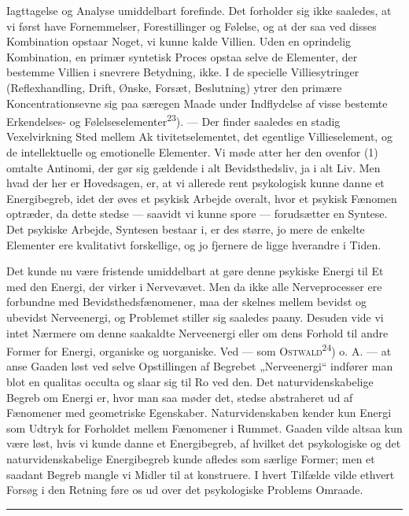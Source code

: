 \documentclass[12pt,a4paper,openany]{book}
\newcommand{\opage}[1]{\marginnote{\footnotesize\textit{[#1]}}}
\begin{document}
Iagttagelse og Analyse umiddelbart forefinde. Det forholder sig ikke saaledes,
at vi først have Fornemmelser, Forestillinger og Følelse, og at der saa ved
disses Kombination opstaar Noget, vi kunne kalde Villien. Uden en oprindelig
Kombination, en primær syntetisk Proces opstaa selve de Elementer, der bestemme
Villien i snevrere Betydning, ikke. I de specielle Villiesytringer
(Reflexhandling, Drift, Ønske, Forsæt, Beslutning) ytrer den primære
Koncentrationsevne sig paa særegen Maade under Indflydelse af visse bestemte
Erkendelses- og Følelseselementer\textsuperscript{23}). --- Der finder saaledes
en stadig Vexelvirkning Sted mellem Ak%
\opage{27}tivitetselementet, det egentlige Villieselement, og de intellektuelle
og emotionelle Elementer. Vi møde atter her den ovenfor (1) omtalte Antinomi,
der gør sig gældende i alt Bevidsthedsliv, ja i alt Liv. Men hvad der her er
Hovedsagen, er, at vi allerede rent psykologisk kunne danne et Energibegreb,
idet der øves et psykisk Arbejde overalt, hvor et psykisk Fænomen optræder, da
dette stedse --- saavidt vi kunne spore --- forudsætter en Syntese. Det
psykiske Arbejde, Syntesen bestaar i, er des større, jo mere de enkelte
Elementer ere kvalitativt forskellige, og jo fjernere de ligge hverandre i Tiden.

Det kunde nu være fristende umiddelbart at gøre denne psykiske Energi til Et
med den Energi, der virker i Nervevævet. Men da ikke alle Nerveprocesser ere
forbundne med Bevidsthedsfænomener, maa der skelnes mellem bevidst og ubevidst
Nerveenergi, og Problemet stiller sig saaledes paany. Desuden vide vi intet
Nærmere om denne saakaldte Nerveenergi eller om dens Forhold til andre Former
for Energi, organiske og uorganiske. Ved --- som
\textsc{Ostwald}\textsuperscript{24}) o. A. --- at anse Gaaden løst ved selve
Opstillingen af Begrebet „Nerveenergi“ indfører man blot en qualitas occulta og
slaar sig til Ro ved den. Det naturvidenskabelige Begreb om Energi er, hvor man
saa møder det, stedse abstraheret ud af Fænomener med geometriske Egenskaber.
Naturvidenskaben kender kun Energi som Udtryk for Forholdet mellem Fænomener i
Rummet. Gaaden vilde altsaa kun være løst, hvis vi kunde danne et Energibegreb,
af hvilket det psykologiske og det naturvidenskabelige Energibegreb kunde
afledes som særlige Former; men et saadant Begreb mangle vi Midler til at
konstruere. I hvert Tilfælde vilde ethvert Forsøg i den Retning føre os ud over
det psykologiske Problems Omraade.

\begin{center}\rule{2cm}{0.4pt}\end{center}
\end{document}
